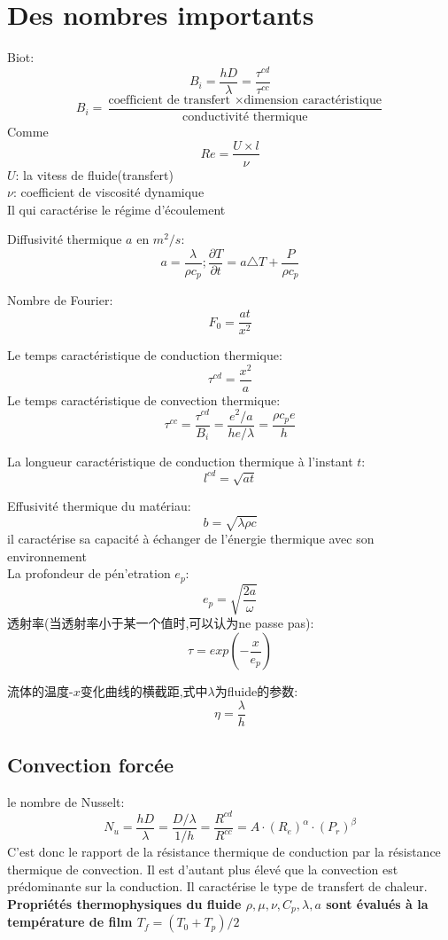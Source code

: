 \documentclass{article}
\begin{document}
\section{Des nombres importants}
Biot:$$B_i = \frac{ hD}{\lambda }=\frac{\tau^{cd}}{\tau^{cc}}$$
$$B_i = \frac{ \text{coefficient de transfert } \times \text{dimension caract\'eristique} }{\text{conductivit\'e thermique}}$$
Comme $$Re=\frac{U\times l}{\nu}$$
$U$: la vitess de fluide(transfert)\\
$\nu$: coefficient de viscosit\'e dynamique\\
Il qui caract\'erise le r\'egime d'\'ecoulement

Diffusivit\'e thermique $a$ en $m^2/s$:$$a=\frac{\lambda }{\rho c_p};\frac{\partial T}{\partial t}=a\triangle T + \frac{P}{\rho c_p}$$

Nombre de Fourier:$$F_0=\frac{ at}{x^2}$$

Le temps caract\'eristique de conduction thermique:$$\tau^{cd}=\frac{x^2}{a}$$
Le temps caract\'eristique de convection thermique:$$\tau^{cc}=\frac{\tau^{cd}}{B_i}=\frac{e^2/a }{he/\lambda }=\frac{\rho c_p e}{h}$$

La longueur caract\'eristique de conduction thermique \`a l'instant $t$:$$l^{cd}=\sqrt{at}$$

Effusivit\'e thermique du mat\'eriau:$$b=\sqrt{\lambda \rho c}$$
il caract\'erise sa capacit\'e \`a \'echanger de l'\'energie thermique avec son environnement\\

La profondeur de p\'en'etration $e_p$:$$e_p=\sqrt{\frac{2a}{\omega}}$$
透射率(当透射率小于某一个值时,可以认为ne passe pas):$$\tau = exp(-\frac{x}{e_p})$$


流体的温度-$x$变化曲线的横截距,式中$\lambda$为fluide的参数:$$\eta=\frac{\lambda }{h}$$

\subsection{Convection forc\'ee}
le nombre de Nusselt:$$N_u = \frac{hD}{\lambda }=\frac{D/\lambda }{1/h}=\frac{R^{cd}}{R^{cc}}=A\cdot (R_e)^{\alpha}\cdot (P_r)^{\beta}$$
C'est donc le rapport de la r\'esistance thermique de conduction par la r\'esistance thermique de convection. Il est d'autant plus \'elev\'e que la convection est pr\'edominante sur la conduction. Il caract\'erise le type de transfert
de chaleur.\\
\textbf{Propri\'et\'es thermophysiques du fluide $\rho, \mu, \nu, C_p, \lambda, a$ sont \'evalu\'es \`a la temp\'erature de film $T_f = (T_0 + T_p)/2$}
\end{document}
